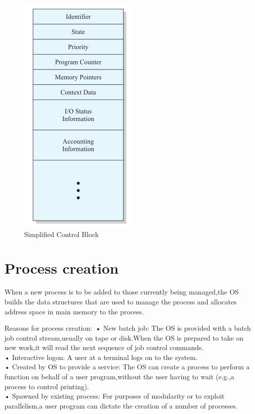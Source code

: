 \begin{figure}
\centering
\includegraphics{img/simplifiedcontrolblock.PNG}
\caption{Simplified Control Block}
\label{fig:simpblock}
\end{figure}


\section{Process creation}
When a new process is to be added to those currently being
managed,the OS builds the data structures that are used to manage the process and
allocates address space in main memory to the process. 

Reasons for process creation:\
• New batch job: The OS is provided with a batch job control stream,usually on tape or
disk.When the OS is prepared to take on new work,it will read the
next sequence of job control commands.\\
• Interactive logon: A user at a terminal logs on to the system.\\
• Created by OS to provide a service: The OS can create a process to perform a function on behalf of a user
program,without the user having to wait (e.g.,a process to control
printing).\\
• Spawned by existing process: For purposes of modularity or to exploit parallelism,a user program
can dictate the creation of a number of processes.\\

